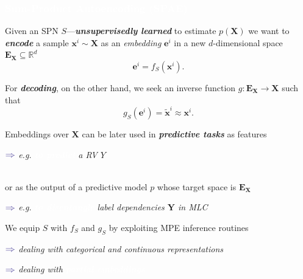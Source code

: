 \documentclass[xcolor={usenames,dvipsnames,svgnames}, compress]{beamer}
\newcommand{\highlighttext}[2][yellow]{{\colorbox{#1}{\textcolor{white}{#2}}}}
\begin{document}
\begin{frame}[t]
  \frametitle{\highlighttext[bgrey0]{Sum-Product Autoencoding (SPAE)}}
  \footnotesize

  Given an SPN $S$---\emph{\textbf{unsupervisedly learned}} to
  estimate $p(\mathbf{X})$ we want to {{\textbf{\emph{encode}}}} a sample
  $\mathbf{x}^{i}\sim\mathbf{X}$ as an \emph{embedding} $\mathbf{e}^{i}$ in a new $d$-dimensional
space $\mathbf{E}_{\mathbf{X}}\subseteq\mathbb{R}^{d}$
    $$\mathbf{e}^{i} = f_{S}(\mathbf{x}^{i}).$$

 For \textbf{\emph{decoding}}, on the other hand, we seek an inverse function
$g\colon\mathbf{E}_{\mathbf{X}}\rightarrow\mathbf{X}$ such that
$$ g_{S}(\mathbf{e}^{i}) =
{\tilde{\mathbf{x}}}^{i}\approx{{\mathbf{x}}}^{i}.$$

Embeddings over $\mathbf{X}$ can be later used in {\textbf{\emph{predictive
  tasks}}} as features
\begin{minipage}{1.0\linewidth}
      \raggedleft
      $\color{violet}\boldsymbol\Rightarrow$
      \scriptsize
     \emph{e.g. \highlighttext[tomato0]{\emph{\textbf{to predict}}} a RV $Y$%
     }
\end{minipage}\\[5pt]
or as the output of a predictive model $p$ whose target space
is $\mathbf{E}_{\mathbf{X}}$
\begin{minipage}{1.0\linewidth}
      \raggedleft
      $\color{violet}\boldsymbol\Rightarrow$
      \scriptsize
     \emph{e.g. \highlighttext[tomato0]{\emph{\textbf{to disentangle}}} label dependencies $\mathbf{Y}$ in MLC%
     }
\end{minipage}\par\bigskip

We equip $S$ with $f_{S}$ and $g_{S}$ by exploiting MPE inference routines
\begin{minipage}{1.0\linewidth}
  \vspace{5pt}
  \raggedleft
  $\color{violet}\boldsymbol\Rightarrow$
      {\scriptsize
     \emph{dealing with categorical and continuous representations}}\par
      $\color{violet}\boldsymbol\Rightarrow$
      {\scriptsize
     \emph{dealing with \highlighttext[tomato0]{\emph{\textbf{partial embeddings}}}}}
   \end{minipage}\par\bigskip

\end{frame}
\end{document}
